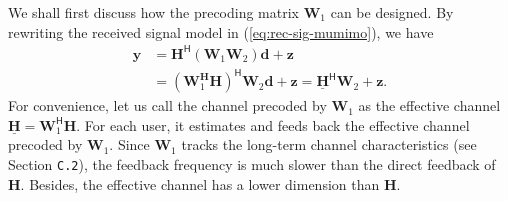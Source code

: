 \documentclass[a4paper,12pt]{article}%
\begin{document}
We shall first discuss how the precoding matrix $\mathbf{W}_1$ can be designed. By rewriting the received signal model in (\ref{eq:rec-sig-mumimo}), we have
\begin{align}
\mathbf{y} &= \mathbf{H}^\mathsf{H}(\mathbf{W}_1 \mathbf{W}_2)\mathbf{d} + \mathbf{z} \nonumber \\
&= (\mathbf{W}_1^\mathbf{H} \mathbf{H})^\mathsf{H} \mathbf{W}_2\mathbf{d} + \mathbf{z} = \underline{\mathbf{H}}^\mathsf{H} \mathbf{W}_2 + \mathbf{z}.
\end{align}
For convenience, let us call the channel precoded by $\mathbf{W}_1$ as the effective channel $\underline{\mathbf{H}}=\mathbf{W}_1^\mathsf{H} \mathbf{H}$. For each user, it estimates and feeds back the effective channel precoded by $\mathbf{W}_1$. Since $\mathbf{W}_1$ tracks the long-term channel characteristics (see Section \texttt{C.2}), the feedback frequency is much slower than the direct feedback of $\mathbf{H}$. Besides, the effective channel has a lower dimension than $\mathbf{H}$.
\end{document}
